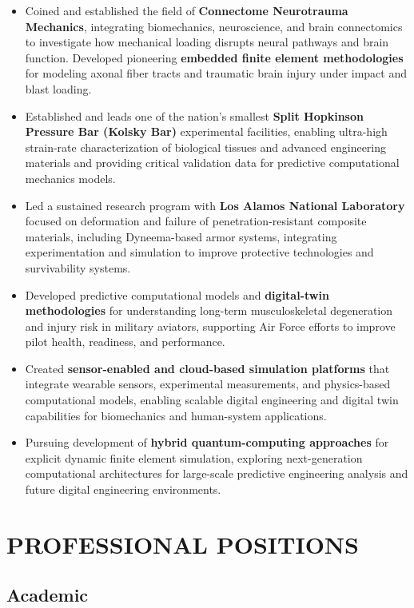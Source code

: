 \documentclass[a4paper,10pt]{article}
\begin{document}
\begin{itemize}[leftmargin=*, itemsep=0pt]
\item Coined and established the field of \textbf{Connectome Neurotrauma Mechanics}, integrating biomechanics, neuroscience, and brain connectomics to investigate how mechanical loading disrupts neural pathways and brain function. Developed pioneering \textbf{embedded finite element methodologies} for modeling axonal fiber tracts and traumatic brain injury under impact and blast loading.
\item Established and leads one of the nation's smallest \textbf{Split Hopkinson Pressure Bar (Kolsky Bar)} experimental facilities, enabling ultra-high strain-rate characterization of biological tissues and advanced engineering materials and providing critical validation data for predictive computational mechanics models.
\item Led a sustained research program with \textbf{Los Alamos National Laboratory} focused on deformation and failure of penetration-resistant composite materials, including Dyneema-based armor systems, integrating experimentation and simulation to improve protective technologies and survivability systems.
\item Developed predictive computational models and \textbf{digital-twin methodologies} for understanding long-term musculoskeletal degeneration and injury risk in military aviators, supporting Air Force efforts to improve pilot health, readiness, and performance.
\item Created \textbf{sensor-enabled and cloud-based simulation platforms} that integrate wearable sensors, experimental measurements, and physics-based computational models, enabling scalable digital engineering and digital twin capabilities for biomechanics and human-system applications.
\item Pursuing development of \textbf{hybrid quantum-computing approaches} for explicit dynamic finite element simulation, exploring next-generation computational architectures for large-scale predictive engineering analysis and future digital engineering environments.
\end{itemize}


\newpage


\section*{PROFESSIONAL POSITIONS}

\subsection*{Academic}
\end{document}
